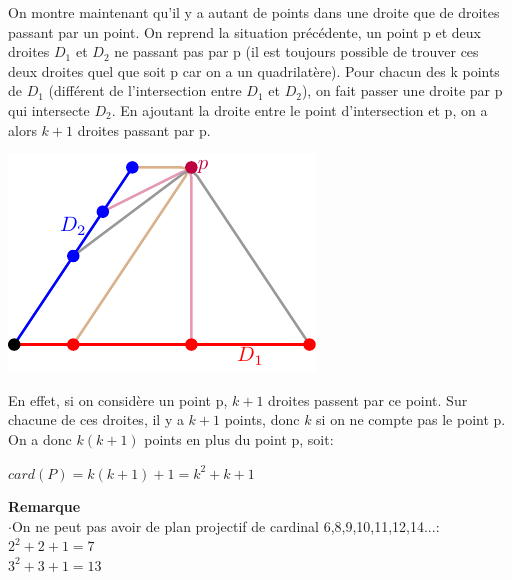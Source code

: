 \documentclass[a4paper]{article}
\begin{document}
On montre maintenant qu'il y a autant de points dans une droite que de droites passant par un point. On reprend la situation précédente, un point p et deux droites $D_1$ et $D_2$ ne passant pas par p (il est toujours possible de trouver ces deux droites quel que soit p car on a un quadrilatère). Pour chacun des k points de $D_1$ (différent de l'intersection entre $D_1$ et $D_2$), on fait passer une droite par p qui intersecte $D_2$. En ajoutant la droite entre le point d'intersection et p, on a alors $k+1$ droites passant par p.\smallskip\\
\begin{center}
  \includegraphics[scale=1]{preuve.pdf}
  \end{center}
En effet, si on considère un point p, $k+1$ droites passent par ce point. Sur chacune de ces droites, il y a $k+1$ points, donc $k$ si on ne compte pas le point p. On a donc $k(k+1)$ points en plus du point p, soit:
\begin{center}
$card(P)=k(k+1)+1=k^2+k+1$
\end{center}
\bigskip
\textbf{Remarque}\\
$\cdot$On ne peut pas avoir de plan projectif de cardinal 6,8,9,10,11,12,14...: \\
$2^2+2+1=7$ \\
  $3^2+3+1=13$\\
\end{document}
